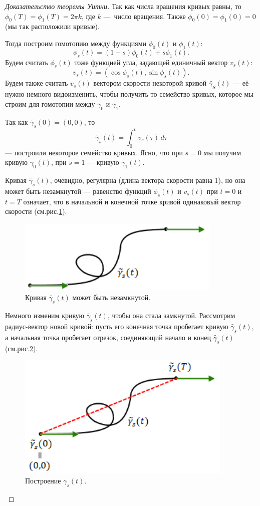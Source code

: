 \begin{proof}[Доказательство теоремы Уитни]
    Так как числа вращения кривых равны, то $\phi_0(T) = \phi_1(T) = 2\pi k$, где $k$ — число вращения. Также $\phi_0(0) = \phi_1(0) = 0$ (мы так расположили кривые).

    Тогда построим гомотопию между функциями $\phi_0(t)$ и $\phi_1(t)$:
    \[\phi_s(t) = (1-s) \phi_0(t) + s \phi_1(t).\]
    Будем считать $\phi_s(t)$ тоже функцией угла, задающей единичный вектор $v_s(t)$:
    \[v_s(t) = (\cos{\phi_s(t)}, \sin{\phi_s(t)}).\]
    Будем также считать $v_s(t)$ вектором скорости некоторой кривой $\tilde{\gamma_S}(t)$ — её нужно немного видоизменить, чтобы получить то семейство кривых, которое мы строим для гомотопии между $\gamma_0$ и $\gamma_1$.

    Так как $\tilde{\gamma_s}(0) = (0,0)$, то 
    \[\tilde{\gamma_s}(t) = \int_{0}^{t} v_s(\tau) \, d\tau\]
    — построили некоторое семейство кривых. Ясно, что при $s = 0$ мы получим кривую $\gamma_0(t)$, при $s = 1$ — кривую $\gamma_1(t)$.

    Кривая $\tilde{\gamma_s}(t)$, очевидно, регулярна (длина вектора скорости равна 1), но она может быть незамкнутой — равенство функций $\phi_s(t)$ и $v_s(t)$ при $t=0$ и $t=T$ означает, что в начальной и конечной точке кривой одинаковый вектор скорости (см.рис.\ref{fig:c13.2}).

    \begin{figure}[ht]
        \centering
        \includegraphics[scale=0.7]{images/c13.2.png}
        \caption{Кривая $\tilde{\gamma_s}(t)$ может быть незамкнутой.}
        \label{fig:c13.2}
    \end{figure}

    Немного изменим кривую $\tilde{\gamma_s}(t)$, чтобы она стала замкнутой. Рассмотрим радиус-вектор новой кривой: пусть его конечная точка пробегает кривую $\tilde{\gamma_s}(t)$, а начальная точка пробегает отрезок, соединяющий начало и конец $\tilde{\gamma_s}(t)$ (см.рис.\ref{fig:c13.3}).

    \begin{figure}[ht]
        \centering
        \includegraphics[scale=0.7]{images/c13.3.png}
        \caption{Построение $\gamma_s(t)$.}
        \label{fig:c13.3}
    \end{figure}


\end{proof}
